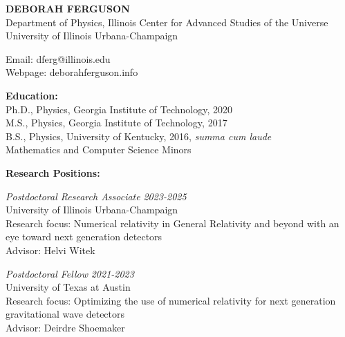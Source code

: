 \documentclass[11pt]{article}
\begin{document}
%	
\begin{center}
  \textbf{DEBORAH FERGUSON}\\
  Department of Physics, Illinois Center for Advanced Studies of the Universe\\
  University of Illinois Urbana-Champaign\\
\end{center}  

\begin{flushleft}

  Email: dferg@illinois.edu\\
  Webpage: deborahferguson.info\\
  \vspace{8px}
  
  \textbf{Education:}\\
  Ph.D., Physics, Georgia Institute of Technology, 2020\\
  M.S., Physics, Georgia Institute of Technology, 2017\\
  B.S., Physics, University of Kentucky, 2016, \textit{summa cum laude} \\ Mathematics and Computer Science Minors\\

\vspace{8px}

  \textbf{Research Positions:}\\
  \vspace{4px}
  
  \textit{Postdoctoral Research Associate} \hfill \textit{2023-2025} \\
  University of Illinois Urbana-Champaign\\
  Research focus: Numerical relativity in General Relativity and beyond with an\\ eye toward next generation detectors\\
  Advisor: Helvi Witek\\
  
 \vspace{8px}  
 
  \textit{Postdoctoral Fellow} \hfill \textit{2021-2023} \\
  University of Texas at Austin\\
  Research focus: Optimizing the use of numerical relativity for next generation\\ gravitational wave detectors\\
  Advisor: Deirdre Shoemaker\\
  

\end{flushleft}
\end{document}
